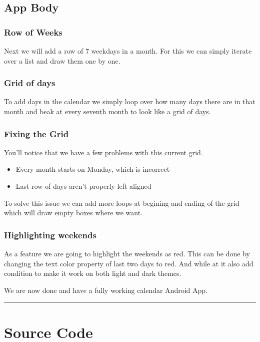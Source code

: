 \documentclass[12pt,oneside]{book}
\begin{document}
    \section{App Body}
        \subsection{Row of Weeks}
Next we will add a row of 7 weekdays in a month. For this we can simply iterate over a list and draw them one by one.

        \subsection{Grid of days}
To add days in the calendar we simply loop over how many days there are in that month and beak at every seventh month to look like a grid of days.

        \subsection{Fixing the Grid}
You'll notice that we have a few problems with this current grid.
\begin{itemize}
    \item Every month starts on Monday, which is incorrect
    \item Last row of days aren't properly left aligned
\end{itemize}
To solve this issue we can add more loops at begining and ending of the grid which will draw empty boxes where we want.

        \subsection{Highlighting weekends}
As a feature we are going to highlight the weekends as red. This can be done by changing the text color property of last two days to red. And while at it also add condition to make it work on both light and dark themes.

\vspace*{2\baselineskip}
We are now done and have a fully working calendar Android App.

\vfill \rule{\textwidth}{0.4pt}

\chapter{Source Code}
\end{document}

